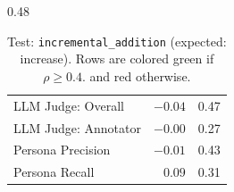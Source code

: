 \begin{table}[htbp]
\begin{subtable}[t]{0.48\textwidth}
\begin{tabular}{lrr}
\rowcolor{matchFalse} LLM Judge: Overall                    &  $-0.04$ &  0.47 \\
\rowcolor{matchFalse} LLM Judge: Annotator        &  $-0.00$ &  0.27 \\
\rowcolor{matchFalse} Persona Precision                     &  $-0.01$ &  0.43 \\
\rowcolor{matchFalse} Persona Recall                        &   $0.09$ &  0.31 \\
\bottomrule
\end{tabular}
\caption{LLM metrics}
\end{subtable}
\caption{Test: \texttt{incremental\_addition} (expected: increase). Rows are colored green if $\rho\geq0.4$. and red otherwise.}
\label{tab:incremental_addition}
\end{table}




